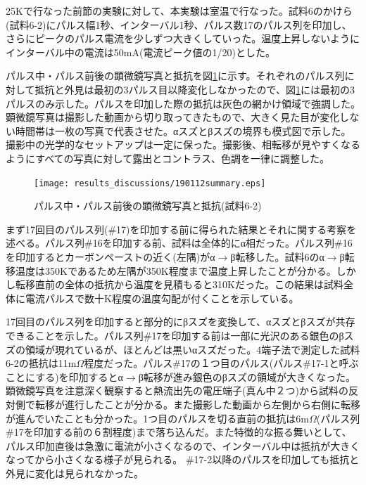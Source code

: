 25Kで行なった前節の実験に対して、本実験は室温で行なった。試料6のかけら(試料6-2)にパルス幅1秒、インターバル1秒、パルス数17のパルス列を印加し、さらにピークのパルス電流を少しずつ大きくしていった。温度上昇しないようにインターバル中の電流は50mA(電流ピーク値の1/20)とした。

パルス中・パルス前後の顕微鏡写真と抵抗を図\ref{fig:190112summary}に示す。それぞれのパルス列に対して抵抗と外見は最初の3パルス目以降変化しなかったので、図\ref{fig:190112summary}には最初の3パルスのみ示した。パルスを印加した際の抵抗は灰色の網かけ領域で強調した。顕微鏡写真は撮影した動画から切り取ってきたもので、大きく見た目が変化しない時間帯は一枚の写真で代表させた。αスズとβスズの境界も模式図で示した。撮影中の光学的なセットアップは一定に保った。撮影後、相転移が見やすくなるようにすべての写真に対して露出とコントラス、色調を一律に調整した。
\begin{landscape}
\begin{figure}[!h]
    \begin{center}
   \texttt{[image: results\_discussions/190112summary.eps]}
  \end{center}
    \caption{パルス中・パルス前後の顕微鏡写真と抵抗(試料6-2)}
  \label{fig:190112summary}
\end{figure}
\end{landscape}

まず17回目のパルス列(\#17)を印加する前に得られた結果とそれに関する考察を述べる。パルス列\#16を印加する前、試料は全体的にα相だった。パルス列\#16を印加するとカーボンペーストの近く(左隅)がα$\to$β転移した。試料6のα$\to$β転移温度は350Kであるため左隅が350K程度まで温度上昇したことが分かる。しかし転移直前の全体の抵抗から温度を見積もると310Kだった。この結果は試料全体に電流パルスで数十K程度の温度勾配が付くことを示している。

17回目のパルス列を印加すると部分的にβスズを変換して、αスズとβスズが共存できることを示した。パルス列\#17を印加する前は一部に光沢のある銀色のβスズの領域が現れているが、ほとんどは黒いαスズだった。4端子法で測定した試料6-2の抵抗は11m$\Omega$程度だった。パルス\#17の１つ目のパルス(パルス\#17-1と呼ぶことにする)を印加するとα$\to$β転移が進み銀色のβスズの領域が大きくなった。顕微鏡写真を注意深く観察すると熱流出先の電圧端子(真ん中２つ)から試料の反対側で転移が進行したことが分かる。また撮影した動画から左側から右側に転移が進んでいたことも分かった。1つ目のパルスを切る直前の抵抗は6m$\Omega$(パルス列\#17を印加する前の６割程度)まで落ち込んだ。また特徴的な振る舞いとして、パルス印加直後は急激に電流が小さくなるので、インターバル中は抵抗が大きくなってから小さくなる様子が見られる。
\#17-2以降のパルスを印加しても抵抗と外見に変化は見られなかった。

